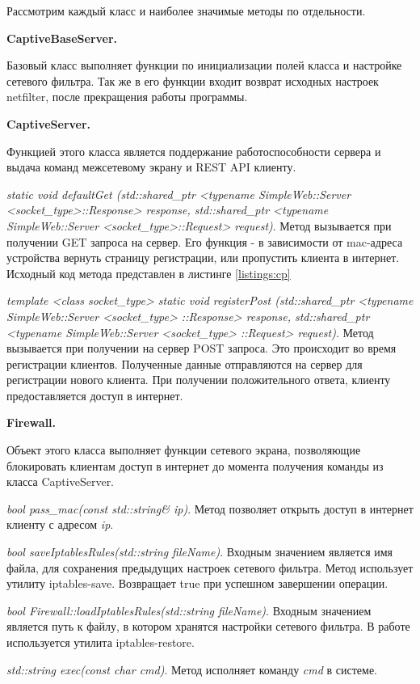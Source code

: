 Рассмотрим каждый класс и наиболее значимые методы по отдельности.

\textbf{CaptiveBaseServer.}

Базовый класс выполняет функции по инициализации полей класса и настройке сетевого фильтра. Так же в его функции входит возврат исходных настроек netfilter, после прекращения работы программы.

\textbf{CaptiveServer.}

Функцией этого класса является поддержание работоспособности сервера и выдача команд межсетевому экрану и REST API клиенту.

\textit{static void defaultGet (std::shared\_ptr <typename  SimpleWeb::Server <socket\_type>::Response> response, std::shared\_ptr <typename SimpleWeb::Server <socket\_type>::Request> request)}. Метод вызывается при получении GET запроса на сервер. Его функция - в зависимости от mac-адреса устройства вернуть страницу регистрации, или пропустить клиента в интернет. Исходный код метода представлен в листинге \ref{listings:cp}

\textit{template <class socket\_type> static void registerPost (std::shared\_ptr <typename SimpleWeb::Server <socket\_type> ::Response> response, std::shared\_ptr <typename SimpleWeb::Server <socket\_type> ::Request> request)}. Метод вызывается при получении на сервер POST запроса. Это происходит во время регистрации клиентов. Полученные данные отправляются на сервер для регистрации нового клиента. При получении положительного ответа, клиенту предоставляется доступ в интернет.

\textbf{Firewall.}

Объект этого класса выполняет функции сетевого экрана, позволяющие блокировать клиентам доступ в интернет до момента получения команды из класса CaptiveServer.

\textit{bool pass\_mac(const std::string\& ip)}. Метод позволяет открыть доступ в интернет клиенту с адресом \textit{ip}.

\textit{bool saveIptablesRules(std::string fileName)}. Входным значением является имя файла, для сохранения предыдущих настроек сетевого фильтра. Метод использует утилиту iptables-save. Возвращает true при успешном завершении операции.

\textit{bool Firewall::loadIptablesRules(std::string fileName)}. Входным значением является путь к файлу, в котором хранятся настройки сетевого фильтра. В работе используется утилита iptables-restore.

\textit{std::string exec(const char\* cmd)}. Метод исполняет команду \textit{cmd} в системе.

